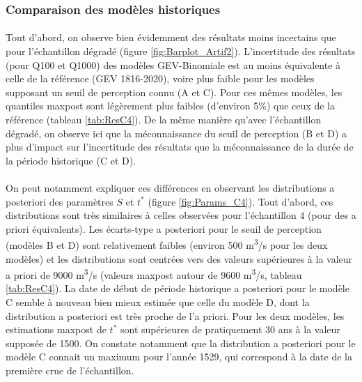 \documentclass[11pt]{article}
\begin{document}
		\subsubsection{Comparaison des modèles historiques}
		
		
	\paragraph{} Tout d'abord, on observe bien évidemment des résultats moins incertains que pour l'échantillon dégradé (figure \ref{fig:Barplot_Artif2}). L'incertitude des résultats (pour Q100 et Q1000) des modèles GEV-Binomiale est au moins équivalente à celle de la référence (GEV 1816-2020), voire plus faible pour les modèles supposant un seuil de perception connu (A et C). Pour ces mêmes modèles, les quantiles maxpost sont légèrement plus faibles (d'environ 5\%) que ceux de la référence (tableau \ref{tab:ResC4}). De la même manière qu'avec l'échantillon dégradé, on observe ici que la méconnaissance du seuil de perception (B et D) a plus d'impact sur l'incertitude des résultats que la méconnaissance de la durée de la période historique (C et D). 
	
	\paragraph{} On peut notamment expliquer ces différences en observant les distributions a posteriori des paramètres $S$ et $t^{*}$ (figure \ref{fig:Params_C4}). Tout d'abord, ces distributions sont très similaires à celles observées pour l'échantillon 4 (pour des a priori équivalents). Les écarts-type a posteriori pour le seuil de perception (modèles B et D) sont relativement faibles (environ 500 m\textsuperscript{3}/s pour les deux modèles) et les distributions sont centrées vers des valeurs supérieures à la valeur a priori de 9000 m\textsuperscript{3}/s (valeurs maxpost autour de 9600 m\textsuperscript{3}/s, tableau \ref{tab:ResC4}). La date de début de période historique a posteriori pour le modèle C semble à nouveau bien mieux estimée que celle du modèle D, dont la distribution a posteriori est très proche de l'a priori. Pour les deux modèles, les estimations maxpost de $t^*$ sont supérieures de pratiquement 30 ans à la valeur supposée de 1500. On constate notamment que la distribution a posteriori pour le modèle C connait un maximum pour l'année 1529, qui correspond à la date de la première crue de l'échantillon. 
	
\end{document}
